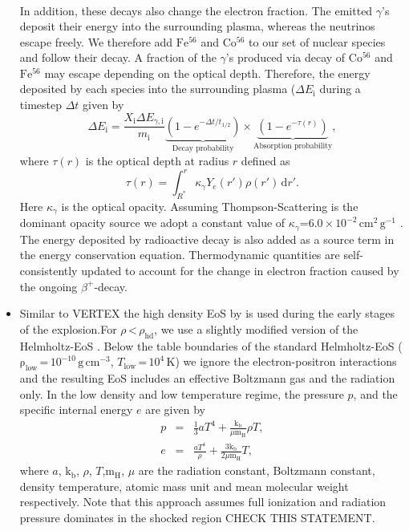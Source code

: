 \documentclass[fleqn,usenatbib]{mnras}
\newcommand{\ud}{\ensuremath{\mathrm{d}}}
\newcommand{\iron}{$\mathrm{Fe^{56}}$\xspace}
\newcommand{\cobalt}{$\mathrm{Co^{56}}$\xspace}
\newcommand{\gcc}{\text{g}\, \text{cm}^{-3}}
\newcommand{\vertex}{\textsc{V{\footnotesize ERTEX}}\xspace}
\newcommand{\NY}[2]{{\color{blue}\sout{#1}#2}}
\begin{document}
\begin{itemize}
\begin{eqnarray}
\end{eqnarray}
In addition, these decays also change the electron fraction. The emitted $\gamma$'s deposit their energy into the surrounding plasma, whereas the neutrinos escape freely. We therefore add \iron and \cobalt to our set of nuclear species and follow their decay. A fraction of the $\gamma$'s produced via decay of \cobalt and \iron may escape depending on the optical depth. Therefore, the energy deposited by each species into the surrounding plasma ($\Delta E_{\mathrm{i}}$ during a timestep $\Delta t$ given by
\begin{equation}
        \Delta E_{\mathrm{i}} =  \frac{X_{\mathrm{i}}\Delta E_{\gamma,\mathrm{i}}}{m_{\mathrm{i}}} \underbrace{\left( 1 - e^{-\Delta t / t_{1/2}} \right)}_{\text{Decay probability}}\times \underbrace{\left( 1 - e^{-\tau(r)} \right)}_{\text{Absorption probability}},
\end{equation}
where $\tau(r)$ is the optical depth at radius $r$ defined as
\begin{equation}
    \tau(r) = \int_{R^*}^{r} \kappa_{\gamma} Y_e(r') \rho(r')\, \ud r'.
\end{equation}
Here $\kappa_{\gamma}$ is the optical opacity. Assuming Thompson-Scattering is the dominant opacity source we adopt a constant value of $\kappa_{\gamma}\mathord{=}6.0\,\mathord{\times}\, 10^{-2} \,\mathrm{cm^2\, g^{-1}}$ \cite{Valenti2011}.   The energy deposited by radioactive decay is also added as a source term in the energy conservation equation. Thermodynamic quantities are self-consistently updated to account for the change in electron fraction caused by the ongoing $\beta^{+}$-decay. 
\item Similar to \vertex the high density EoS by \citet{Lattimer1991}  is used during the early stages of the explosion.For $\rho\,\mathord{<}\,\rho_{\mathrm{hd}}$, we use a slightly modified version of the Helmholtz-EoS \citep[includes Coloumb corrections due to electron-positron interactions]{Timmes1999}. Below the table boundaries of the standard Helmholtz-EoS ($\mathrm{\rho_{low}}\,\mathord{=}\,10^{-10}\, \gcc$, $T_{\mathrm{low}}\,\mathord{=}\,10^{4}\,\mathrm{K}$) we ignore the electron-positron interactions and the resulting EoS includes an effective Boltzmann gas and the radiation only. In the low density and low temperature regime, the pressure $p$, and the specific internal energy $e$ are given by
\begin{eqnarray}
    p &=& \frac{1}{3}aT^4 + \frac{\mathrm{k_b}}{\mu \mathrm{m_{H}}} \rho T, \\
    e &=& \frac{aT^4}{\rho} + \frac{3\mathrm{k_b}}{2\mu \mathrm{m_{H}}} T,\label{equ:pressure-energy-boltzmann-radiation}
\end{eqnarray}
where $a$, $\mathrm{k_b}$, $\rho$, $T$,$\mathrm{m_{H}}$, $\mu$ are the radiation constant, Boltzmann constant, density temperature, atomic mass unit and mean molecular weight respectively. Note that this approach assumes full ionization  and radiation pressure dominates in the shocked region \NY{}{CHECK THIS STATEMENT}.
\end{itemize}
\end{document}
